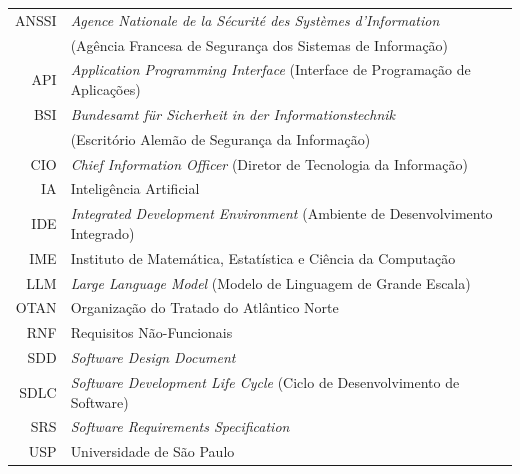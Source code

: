 \documentclass[a4paper,12pt,twoside,english,brazilian]{book}
\begin{document}
\bgroup%
\raggedbottom%



\begin{tabular}{rl}
  ANSSI & \emph{Agence Nationale de la Sécurité des Systèmes d'Information}\\
  & (Agência Francesa de Segurança dos Sistemas de Informação) \\
  API & \emph{Application Programming Interface} (Interface de Programação de Aplicações) \\
  BSI & \emph{Bundesamt für Sicherheit in der Informationstechnik} \\
  & (Escritório Alemão de Segurança da Informação) \\
  CIO & \emph{Chief Information Officer} (Diretor de Tecnologia da Informação) \\
  IA  & Inteligência Artificial \\
  IDE & \emph{Integrated Development Environment} (Ambiente de Desenvolvimento Integrado) \\
  IME & Instituto de Matemática, Estatística e Ciência da Computação \\
  LLM & \emph{Large Language Model} (Modelo de Linguagem de Grande Escala) \\
  OTAN & Organização do Tratado do Atlântico Norte \\
  RNF & Requisitos Não-Funcionais \\
  SDD & \emph{Software Design Document} \\
  SDLC & \emph{Software Development Life Cycle} (Ciclo de Desenvolvimento de Software) \\
  SRS & \emph{Software Requirements Specification} \\
  USP & Universidade de São Paulo \\
\end{tabular} 

\clearpage


\disablenewpage{\listoffigures}
\end{document}
